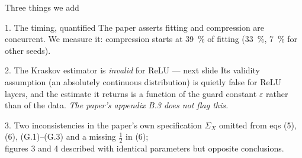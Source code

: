 \documentclass[aspectratio=169,11pt]{beamer}
\begin{document}
\begin{frame}{Three things we add}
\begin{block}{1. The timing, quantified}
The paper asserts fitting and compression are concurrent. We measure it:
compression starts at \SI{39}{\percent} of fitting (\SI{33}{\percent}, \SI{7}{\percent} for other seeds).
\end{block}
\begin{block}{2. The Kraskov estimator is \emph{invalid} for ReLU --- next slide}
Its validity assumption (an absolutely continuous distribution) is quietly false for
ReLU layers, and the estimate it returns is a function of the guard constant
$\varepsilon$ rather than of the data. \emph{The paper's appendix B.3 does not flag this.}
\end{block}
\begin{block}{3. Two inconsistencies in the paper's own specification}
$\Sigma_X$ omitted from eqs (5), (6), (G.1)--(G.3) and a missing $\tfrac12$ in (6);\\
figures 3 and 4 described with identical parameters but opposite conclusions.
\end{block}
\end{frame}
\end{document}
